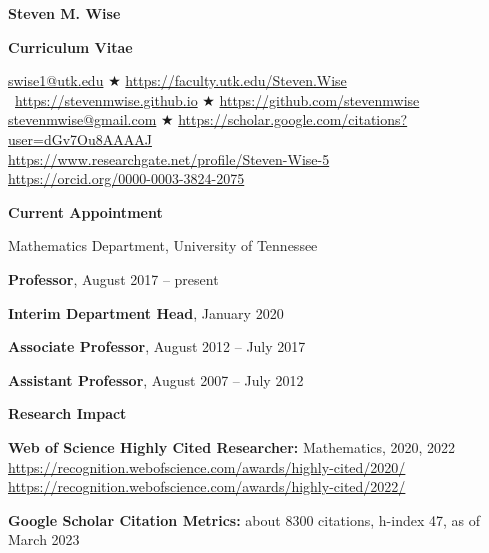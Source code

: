 \documentclass[11pt]{letter}
\begin{document}
    
    \begin{center}
    
{\Huge\bf  Steven M. Wise}

{\Large\bf  Curriculum Vitae}


\url{swise1@utk.edu}  $\bigstar$  \url{https://faculty.utk.edu/Steven.Wise}
	\
\url{https://stevenmwise.github.io}  $\bigstar$    \url{https://github.com/stevenmwise}
	\\
\url{stevenmwise@gmail.com}  $\bigstar$   \url{https://scholar.google.com/citations?user=dGv7Ou8AAAAJ}
	\\
\url{https://www.researchgate.net/profile/Steven-Wise-5}
	\\
\url{https://orcid.org/0000-0003-3824-2075}
    \end{center}

    \medskip

{\LARGE\bf  Current Appointment}
    \begin{description}
    \item
Mathematics Department, University of Tennessee
	\begin{description}
	\item
\textbf{Professor}, August 2017 -- present
	\item
\textbf{Interim Department Head}, January 2020
	\item
\textbf{Associate Professor}, August 2012 -- July 2017
	\item
\textbf{Assistant Professor}, August 2007 -- July 2012
	\end{description}
	\end{description}
	
	\smallskip
	
{\LARGE\bf  Research Impact}
    \begin{description}
    \item
\textbf{Web of Science Highly Cited Researcher:} Mathematics, 2020, 2022
	\\
\url{https://recognition.webofscience.com/awards/highly-cited/2020/}
	\\
\url{https://recognition.webofscience.com/awards/highly-cited/2022/}
   	\item
\textbf{Google Scholar Citation Metrics:} about 8300 citations, h-index 47, as of March 2023
    \end{description}
    
    \smallskip
	
\end{document}
